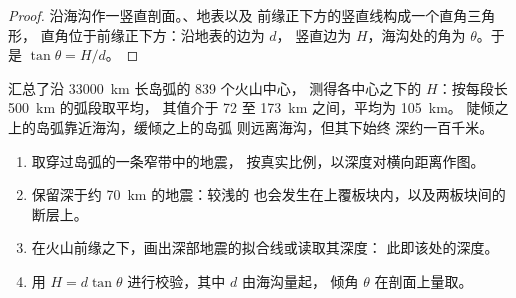 \begin{proof}
沿海沟作一竖直剖面。、地表以及
前缘正下方的竖直线构成一个直角三角形，
直角位于前缘正下方：沿地表的边为 $d$，
竖直边为 $H$，海沟处的角为 $\theta$。于是 $\tan\theta = H/d$。
\end{proof}

汇总了沿 \qty{33000}{km} 长岛弧的 839 个火山中心，
测得各中心之下的 $H$：按每段长 \qty{500}{km} 的弧段取平均，
其值介于 72 至 \qty{173}{km} 之间，平均为 \qty{105}{km}。
陡倾之上的岛弧靠近海沟，缓倾之上的岛弧
则远离海沟，但其下始终
深约一百千米。

\begin{method}[寻找火山之下的板片]\label{met:g12:subduction-magmatism:slab}
\begin{enumerate}
  \item 取穿过岛弧的一条窄带中的地震，
        按真实比例，以深度对横向距离作图。
  \item 保留深于约 \qty{70}{km} 的地震：较浅的
        也会发生在上覆板块内，以及两板块间的
        断层上。
  \item 在火山前缘之下，画出深部地震的拟合线或读取其深度：
        此即该处的深度。
  \item 用 $H = d\tan\theta$ 进行校验，其中 $d$ 由海沟量起，
        倾角 $\theta$ 在剖面上量取。
\end{enumerate}
\end{method}

